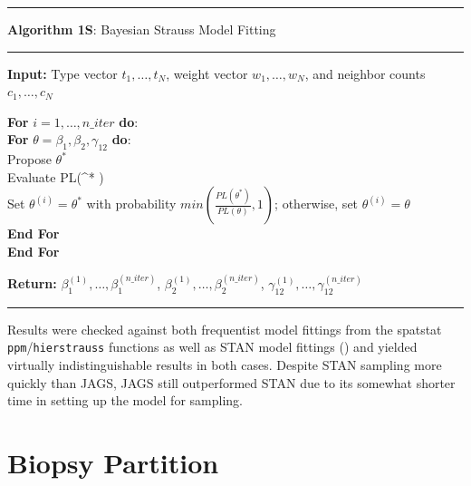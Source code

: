 \documentclass[
]{book}
\begin{document}
\begin{center}\rule{0.5\linewidth}{0.5pt}\end{center}

\textbf{Algorithm 1S}: Bayesian Strauss Model Fitting

\begin{center}\rule{0.5\linewidth}{0.5pt}\end{center}

\textbf{Input:} Type vector \(t_1, \dots, t_N\), weight vector \(w_1, \dots, w_N\), and neighbor counts \(c_1, \dots, c_N\)

\textbf{For} \(i = 1, \dots, n\_iter\) \textbf{do}:\\
\textbar{} \textbf{For} \(\theta = \beta_1, \beta_2, \gamma_{12}\) \textbf{do}:\\
\textbar{} \textbar{} Propose \(\theta^*\)\\
\textbar{} \textbar{} Evaluate PL(\theta\^{}* \textbar{} \cdot )\\
\textbar{} \textbar{} Set \(\theta^{(i)} = \theta^*\) with probability \(min(\frac{PL(\theta^*)}{PL(\theta)}, 1)\); otherwise, set \(\theta^{(i)} = \theta\)\\
\textbar{} \textbf{End For}\\
\textbf{End For}

\textbf{Return:} \(\beta_1^{(1)}, \dots, \beta_1^{(n\_iter)}\), \(\beta_2^{(1)}, \dots, \beta_2^{(n\_iter)}\), \(\gamma_{12}^{(1)}, \dots, \gamma_{12}^{(n\_iter)}\)

\begin{center}\rule{0.5\linewidth}{0.5pt}\end{center}

Results were checked against both frequentist model fittings from the spatstat \texttt{ppm}/\texttt{hierstrauss} functions as well as STAN model fittings (\citet{Carpenter17}) and yielded virtually indistinguishable results in both cases. Despite STAN sampling more quickly than JAGS, JAGS still outperformed STAN due to its somewhat shorter time in setting up the model for sampling.

\hypertarget{biopsy-partition}{%
\chapter{Biopsy Partition}\label{biopsy-partition}}
\end{document}
